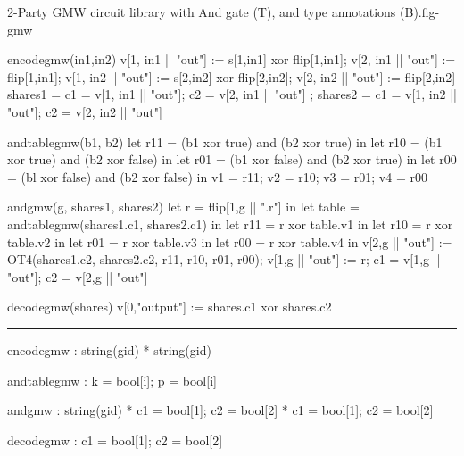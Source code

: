\begin{fpfig}[t]{2-Party GMW circuit library with And gate (T), and type annotations (B).}{fig-gmw}
{\footnotesize
  \begin{verbatimtab}
    encodegmw(in1,in2) {
      v[1, in1 || "out"] := s[1,in1] xor flip[1,in1];
      v[2, in1 || "out"] := flip[1,in1];
      v[1, in2 || "out"] := s[2,in2] xor flip[2,in2];
      v[2, in2 || "out"] := flip[2,in2]
      { shares1 = { c1 = v[1, in1 || "out"]; c2 = v[2, in1 || "out"] };
        shares2 = { c1 = v[1, in2 || "out"]; c2 = v[2, in2 || "out"]} } 
    }
    
    andtablegmw(b1, b2) {
      let r11 = (b1 xor true) and (b2 xor true) in
      let r10 = (b1 xor true) and (b2 xor false) in
      let r01 = (b1 xor false) and (b2 xor true) in
      let r00 = (bl xor false) and (b2 xor false) in
      { v1 = r11; v2 = r10; v3 = r01; v4 = r00 }
    }
    
    andgmw(g, shares1, shares2) {
      let r = flip[1,g || ".r"] in
      let table = andtablegmw(shares1.c1, shares2.c1) in
      let r11 =  r xor table.v1 in
      let r10 =  r xor table.v2 in
      let r01 =  r xor table.v3 in
      let r00 =  r xor table.v4 in
      v[2,g || "out"] := OT4(shares1.c2, shares2.c2, r11, r10, r01, r00);
      v[1,g || "out"] := r;
      { c1 = v[1,g || "out"]; c2 = v[2,g || "out"]}
    }
    
    decodegmw(shares) { v[0,"output"] := shares.c1 xor shares.c2 }   \end{verbatimtab}
}

\rule{130mm}{0.5pt}

{\footnotesize
  \begin{verbatimtab}
   encodegmw   : string(gid) * string(gid)
    
   andtablegmw : { k = bool[i]; p = bool[i] }
    
   andgmw      : string(gid) *  { c1 = bool[1]; c2 = bool[2] } * { c1 = bool[1]; c2 = bool[2] }
    
   decodegmw   : { c1 = bool[1]; c2 = bool[2] }  \end{verbatimtab}
}
\end{fpfig}
